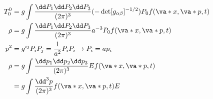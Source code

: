 \begin{align*}
    T^0_0 &= g\int\frac{\dd P_1\dd P_2\dd P_3}{(2\pi)^3}(-\det[g_{\alpha\beta}]^{-1/2})P_0f(\va*{x}, \va*{p}, t)\\
    \rho &= g\int\frac{\dd P_1\dd P_2\dd P_3}{(2\pi)^3}a^{-3}P_0f(\va*{x}, \va*{p}, t)\\
    p^2 &= g^{ij}P_iP_j = \frac{1}{a^2}P_iP_i \to P_i = ap_i\\
    \rho &= g\int\frac{\dd p_1\dd p_2\dd p_3}{(2\pi)^3}Ef(\va*{x}, \va*{p}, t)\\
    & = g\int\frac{\dd^3 p}{(2\pi)^3}f(\va*{x}, \va*{p}, t)E\\
\end{align*}